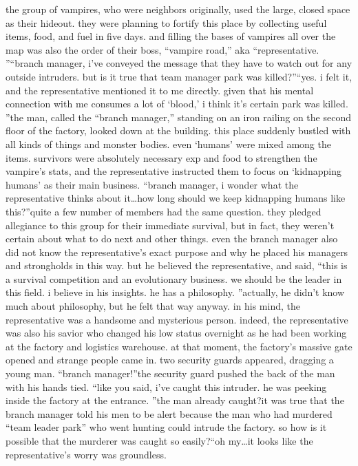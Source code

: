 the group of vampires, who were neighbors originally, used the large, closed space as their hideout.
 they were planning to fortify this place by collecting useful items, food, and fuel in five days.
 and filling the bases of vampires all over the map was also the order of their boss, “vampire road,” aka “representative.
”“branch manager, i’ve conveyed the message that they have to watch out for any outside intruders.
 but is it true that team manager park was killed?”“yes.
 i felt it, and the representative mentioned it to me directly.
 given that his mental connection with me consumes a lot of ‘blood,’ i think it’s certain park was killed.
”the man, called the “branch manager,” standing on an iron railing on the second floor of the factory, looked down at the building.
this place suddenly bustled with all kinds of things and monster bodies.
 even ‘humans’ were mixed among the items.
 survivors were absolutely necessary exp and food to strengthen the vampire’s stats, and the representative instructed them to focus on ‘kidnapping humans’ as their main business.
“branch manager, i wonder what the representative thinks about it…how long should we keep kidnapping humans like this?”quite a few number of members had the same question.
 they pledged allegiance to this group for their immediate survival, but in fact, they weren’t certain about what to do next and other things.
 even the branch manager also did not know the representative’s exact purpose and why he placed his managers and strongholds in this way.
but he believed the representative, and said, “this is a survival competition and an evolutionary business.
 we should be the leader in this field.
 i believe in his insights.
 he has a philosophy.
”actually, he didn’t know much about philosophy, but he felt that way anyway.
in his mind, the representative was a handsome and mysterious person.
 indeed, the representative was also his savior who changed his low status overnight as he had been working at the factory and logistics warehouse.
at that moment, the factory’s massive gate opened and strange people came in.
two security guards appeared, dragging a young man.
“branch manager!”the security guard pushed the back of the man with his hands tied.
“like you said, i’ve caught this intruder.
 he was peeking inside the factory at the entrance.
”the man already caught?it was true that the branch manager told his men to be alert because the man who had murdered “team leader park” who went hunting could intrude the factory.
 so how is it possible that the murderer was caught so easily?“oh my…it looks like the representative’s worry was groundless.
